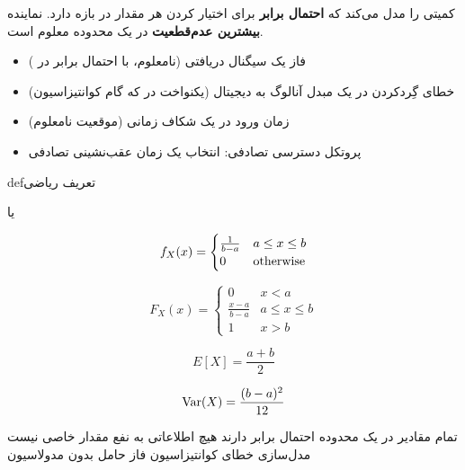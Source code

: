 کمیتی را مدل می‌کند که \textbf{احتمال برابر} برای اختیار کردن هر مقدار در بازه \lr{[a, b]} دارد. نماینده \textbf{بیشترین عدم‌قطعیت} در یک محدوده معلوم است.


\begin{itemize}
\tightlist
\item
  فاز یک سیگنال دریافتی (نامعلوم، با احتمال برابر در \lr{[0, 2\ensuremath{\pi})})
\item
  خطای گِردکردن در یک مبدل آنالوگ به دیجیتال (یکنواخت در  که \lr{\ensuremath{\Delta} =} گام کوانتیزاسیون)
\item
  زمان ورود در یک شکاف زمانی (موقعیت نامعلوم)
\item
  پروتکل دسترسی تصادفی: انتخاب یک زمان عقب‌نشینی تصادفی
\end{itemize}

\begin{PSbox}[unbreakable]{def}{تعریف ریاضی}

 یا 

\end{PSbox}


\[f_X(x) = \begin{cases} \frac{1}{b-a} & a \leq x \leq b \\ 0 & \text{otherwise} \end{cases}\]


\[F_X(x) = \begin{cases} 0 & x < a \\ \frac{x-a}{b-a} & a \leq x \leq b \\ 1 & x > b \end{cases}\]


\[E[X] = \frac{a+b}{2}\]


\[\text{Var}(X) = \frac{(b-a)^2}{12}\]


\lr{\PSyes{}} تمام مقادیر در یک محدوده احتمال برابر دارند\PSbr{}\lr{\PSyes{}} هیچ اطلاعاتی به نفع مقدار خاصی نیست\PSbr{}\lr{\PSyes{}} مدل‌سازی خطای کوانتیزاسیون\PSbr{}\lr{\PSyes{}} فاز حامل بدون مدولاسیون


